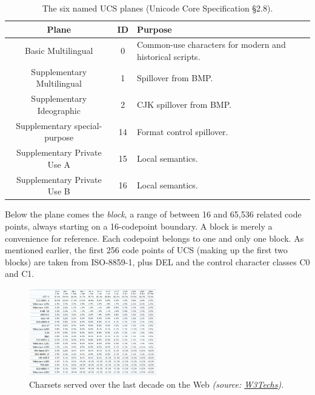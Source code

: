 \begin{table}[!htb]
  \begin{center}
    \begin{tabular}{ |c|c|l| }
      \hline
      Plane & ID & Purpose \\
      \hline
      \hline
      Basic Multilingual & 0 & Common-use characters for modern and historical scripts. \\
      \hline
      Supplementary Multilingual & 1 & Spillover from BMP. \\
      \hline
      Supplementary Ideographic & 2 & CJK spillover from BMP. \\
      \hline
      Supplementary special-purpose & 14 & Format control spillover. \\
      \hline
      Supplementary Private Use A & 15 & Local semantics. \\
      \hline
      Supplementary Private Use B & 16 & Local semantics. \\
      \hline
    \end{tabular}
  \end{center}
  \caption[The six named UCS planes.]{The six named UCS planes (Unicode Core Specification §2.8\cite{unicode}).}
  \label{table:ucsplanes}
\end{table}

Below the plane comes the \textit{block}, a range of between 16 and 65,536 related
code points, always starting on a 16-codepoint boundary. A block is merely a
convenience for reference. Each codepoint belongs to one and only one block.
As mentioned earlier, the first 256 code points of UCS (making up the first two
blocks) are taken from ISO-8859-1, plus DEL and the control character classes
C0 and C1.
\begin{figure}[!htb]
\centering
\includegraphics[width=0.5\textwidth]{media/yearly-charsets.png}
\caption{Charsets served over the last decade on the Web \textit{(source: \href{https://w3techs.com/technologies/history\_overview/character\_encoding/ms/y}{W3Techs})}.}
\label{fig:charsetuse}
\end{figure}

